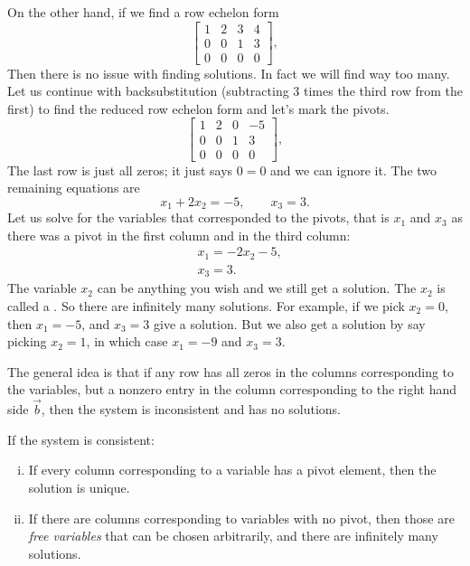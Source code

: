 On the other hand, if we find a row echelon form
\begin{equation*}
\left[
\begin{array}{ccc|c}
1 & 2 & 3 & 4 \\
0 & 0 & 1 & 3 \\
0 & 0 & 0 & 0 
\end{array}
\right] ,
\end{equation*}
Then there is no issue with finding solutions.  In fact we will find way too
many.  Let us continue with backsubstitution (subtracting 3 times the third
row from the first) to find the reduced row echelon form and let's mark the
pivots.
\begin{equation*}
\left[
\begin{array}{ccc|c}
\boxed{1} & 2 & 0 & -5 \\
0 & 0 & \boxed{1} & 3 \\
0 & 0 & 0 & 0 
\end{array}
\right] ,
\end{equation*}
The last row is just all zeros; it just says $0=0$ and we can ignore it.
The two remaining equations are 
\begin{equation*}
x_1 + 2 x_2 = -5 , \qquad
x_3 = 3 .
\end{equation*}
Let us solve for the variables that corresponded to the
pivots, that is $x_1$ and $x_3$ as there was a pivot in the first column
and in the third column:
\begin{align*}
& x_1 = - 2 x_2 -5 , \\
& x_3 = 3 .
\end{align*}
The variable $x_2$ can be anything you wish and we still get a solution.
The $x_2$ is called a \emph{}.
So there are infinitely many solutions.  For example, if we pick $x_2=0$,
then $x_1 = -5$, and $x_3 = 3$ give a solution.  But we also get a solution
by say picking $x_2 = 1$, in which case $x_1 = -9$ and $x_3 = 3$.

\medskip

The general idea is that
if any row has all zeros in the columns corresponding to the
variables, but a nonzero entry in the column corresponding to the right
hand side $\vec{b}$, then the system is inconsistent and has no solutions.

If the system is consistent:
\begin{enumerate}[(i)]
\item If every column corresponding to a variable has a pivot element,
then the solution is unique.
\item If there are columns corresponding to variables with no pivot,
then those are \emph{free variables} that can be chosen
arbitrarily, and there are infinitely many solutions.
\end{enumerate}

